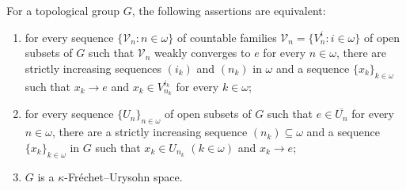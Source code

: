 \documentclass[10pt,a4paper]{amsart}
\newcommand{\w}{\omega}
\begin{document}
\begin{theorem} \label{t:kFU-group-charac}
For a topological group $G$, the following assertions are equivalent:
\begin{enumerate}
\item[{\rm(i)}] for every sequence $\{\mathcal{V}_n: n\in \w\}$ of countable families $\mathcal{V}_n=\{V^i_n: i\in \w\}$ of open subsets of $G$ such that $\mathcal{V}_n$ weakly converges to $e$ for every $n\in\w$, there are strictly increasing sequences  $(i_k)$ and $(n_k)$ in $\w$ and a sequence $\{x_k\}_{k\in\w}$ such that $x_k\to e$ and $x_k\in V^{i_k}_{n_k}$ for every $k\in\w$;
\item[{\rm(ii)}] for every sequence $\{U_n\}_{n\in\w}$ of open subsets of $G$ such that $e\in \overline{U_n}$ for every $n\in\w$, there are a strictly increasing sequence $(n_k)\subseteq \w$ and a sequence $\{x_k\}_{k\in\w}$ in $G$ such that $x_k\in U_{n_k}$ $(k\in\w)$ and $x_k\to e$;
\item[{\rm(iii)}] $G$ is a $\kappa$-Fr\'{e}chet--Urysohn space.
\end{enumerate}
\end{theorem}
\end{document}
